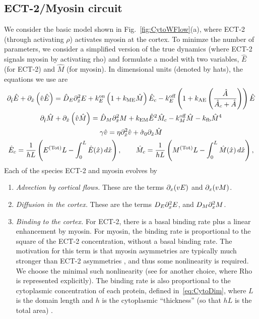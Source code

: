 \documentclass[11pt]{article}
\newcommand{\Tot}[1]{#1^\text{(Tot)}}
\begin{document}
\begin{appendix}
\subsection{ECT-2/Myosin circuit \label{sec:MyModel}}
We consider the basic model shown in Fig.\ \ref{fig:CytoWFlow}(a), where ECT-2 (through activating $\rho$) activates myosin at the cortex. To minimze the number of parameters, we consider a simplified version of the true dynamics (where ECT-2 signals myosin by activating rho) and formulate a model with two variables, $\hat E$ (for ECT-2) and $\hat M$ (for myosin). In dimensional units (denoted by hats), the equations we use are 
\begin{subequations}
\label{eq:MyDim}
\begin{gather}
\partial_{\hat t} \hat E + \partial_{\hat x} \left( \hat v \hat E\right) = \hat D_E \partial_{\hat x}^2 E +\kon_E \left(1+k_\text{ME} \hat M\right)\hat E_c - \koff_E  \left(1+k_\text{AE}\left( \frac{\hat A}{\hat A_c+\hat A}\right)\right)\hat E \\
\partial_{\hat t} \hat M +\partial_{\hat x} \left( \hat v \hat M\right)  = \hat D_M \partial_{\hat x}^2 M +k_\text{EM} \hat E ^2 \hat M_c - \koff_M \hat M -k_\text{fb} \hat M^4 \\
\label{eq:veleqn}
\gamma \hat v = \eta \partial_{\hat x}^2 \hat v +\hat \sigma_0 \partial_{\hat x} \hat M \\
\label{eq:CytoDim}
\hat E_c = \frac{1}{hL}\left(\Tot{E}L-\int_0^L \hat E(\hat x) \, d\hat x\right), \qquad \hat M_c =\frac{1}{hL}\left(\Tot{M}L-\int_0^L \hat M(\hat x) \, d \hat x\right),
\end{gather} 
\end{subequations}
Each of the species ECT-2 and myosin evolves by
\begin{enumerate}
\item \emph{Advection by cortical flows.}  These are the terms $\partial_x (v E)$ and $\partial_x (v M)$.
\item \emph{Diffusion in the cortex.} These are the terms $D_E \partial_x^2 E$, and $D_M \partial_x^2 M$.
\item \emph{Binding to the cortex.} For ECT-2, there is a basal binding rate plus a linear enhancement by myosin. For myosin, the binding rate is proportional to the square of the ECT-2 concentration, without a basal binding rate. The motivation for this term is that myosin asymmetries are typically much stronger than ECT-2 asymmetries \cite{longhini2022aurora, munro2004cortical, mayer2010anisotropies}, and thus some nonlinearity is required. We choose the minimal such nonlinearity (see \cite[Eq.~(1)]{michaud2022versatile} for another choice, where Rho is represented explicitly). The binding rate is also proportional to the cytoplasmic concentration of each protein, defined in\ \eqref{eq:CytoDim}, where $L$ is the domain length and $h$ is the cytoplasmic ``thickness'' (so that $hL$ is the total area) \cite{lang2022oligomerization}.

\end{enumerate}
\end{appendix}
\end{document}
